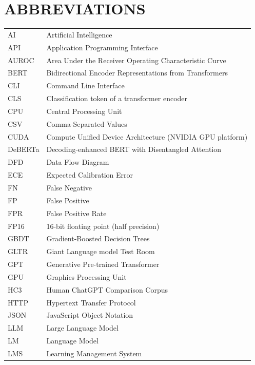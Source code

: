 \chapter*{ABBREVIATIONS}
\begingroup
\renewcommand{\arraystretch}{1.12}
\begin{longtable}{@{}p{3.0cm}p{11.0cm}@{}}
AI      & Artificial Intelligence \\
API     & Application Programming Interface \\
AUROC   & Area Under the Receiver Operating Characteristic Curve \\
BERT    & Bidirectional Encoder Representations from Transformers \\
CLI     & Command Line Interface \\
CLS     & Classification token of a transformer encoder \\
CPU     & Central Processing Unit \\
CSV     & Comma-Separated Values \\
CUDA    & Compute Unified Device Architecture (NVIDIA GPU platform) \\
DeBERTa & Decoding-enhanced BERT with Disentangled Attention \\
DFD     & Data Flow Diagram \\
ECE     & Expected Calibration Error \\
FN      & False Negative \\
FP      & False Positive \\
FPR     & False Positive Rate \\
FP16    & 16-bit floating point (half precision) \\
GBDT    & Gradient-Boosted Decision Trees \\
GLTR    & Giant Language model Test Room \\
GPT     & Generative Pre-trained Transformer \\
GPU     & Graphics Processing Unit \\
HC3     & Human ChatGPT Comparison Corpus \\
HTTP    & Hypertext Transfer Protocol \\
JSON    & JavaScript Object Notation \\
LLM     & Large Language Model \\
LM      & Language Model \\
LMS     & Learning Management System \\

\end{longtable}
